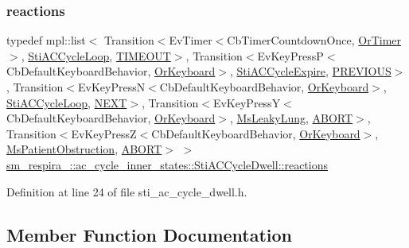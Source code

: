 \subsubsection{\texorpdfstring{reactions}{reactions}}
{\footnotesize\ttfamily typedef mpl\+::list$<$ Transition$<$Ev\+Timer$<$Cb\+Timer\+Countdown\+Once, \hyperlink{classsm__respira__1_1_1OrTimer}{Or\+Timer}$>$, \hyperlink{structsm__respira__1_1_1ac__cycle__inner__states_1_1StiACCycleLoop}{Sti\+A\+C\+Cycle\+Loop}, \hyperlink{structsm__respira__1_1_1ac__cycle__inner__states_1_1StiACCycleDwell_1_1TIMEOUT}{T\+I\+M\+E\+O\+UT}$>$, Transition$<$Ev\+Key\+PressP$<$Cb\+Default\+Keyboard\+Behavior, \hyperlink{classsm__respira__1_1_1OrKeyboard}{Or\+Keyboard}$>$, \hyperlink{structsm__respira__1_1_1ac__cycle__inner__states_1_1StiACCycleExpire}{Sti\+A\+C\+Cycle\+Expire}, \hyperlink{structsm__respira__1_1_1ac__cycle__inner__states_1_1StiACCycleDwell_1_1PREVIOUS}{P\+R\+E\+V\+I\+O\+US}$>$, Transition$<$Ev\+Key\+PressN$<$Cb\+Default\+Keyboard\+Behavior, \hyperlink{classsm__respira__1_1_1OrKeyboard}{Or\+Keyboard}$>$, \hyperlink{structsm__respira__1_1_1ac__cycle__inner__states_1_1StiACCycleLoop}{Sti\+A\+C\+Cycle\+Loop}, \hyperlink{structsm__respira__1_1_1ac__cycle__inner__states_1_1StiACCycleDwell_1_1NEXT}{N\+E\+XT}$>$, Transition$<$Ev\+Key\+PressY$<$Cb\+Default\+Keyboard\+Behavior, \hyperlink{classsm__respira__1_1_1OrKeyboard}{Or\+Keyboard}$>$, \hyperlink{classsm__respira__1_1_1MsLeakyLung}{Ms\+Leaky\+Lung}, \hyperlink{classABORT}{A\+B\+O\+RT}$>$, Transition$<$Ev\+Key\+PressZ$<$Cb\+Default\+Keyboard\+Behavior, \hyperlink{classsm__respira__1_1_1OrKeyboard}{Or\+Keyboard}$>$, \hyperlink{classsm__respira__1_1_1MsPatientObstruction}{Ms\+Patient\+Obstruction}, \hyperlink{classABORT}{A\+B\+O\+RT}$>$ $>$ \hyperlink{structsm__respira__1_1_1ac__cycle__inner__states_1_1StiACCycleDwell_ac7b785d83753f2a557af1ea316548944}{sm\+\_\+respira\+\_\+::ac\+\_\+cycle\+\_\+inner\+\_\+states\+::\+Sti\+A\+C\+Cycle\+Dwell\+::reactions}}



Definition at line 24 of file sti\+\_\+ac\+\_\+cycle\+\_\+dwell.\+h.



\subsection{Member Function Documentation}
\mbox{\label{structsm__respira__1_1_1ac__cycle__inner__states_1_1StiACCycleDwell_a3c863cd608c0ab01cc611743c5b18764}} 
